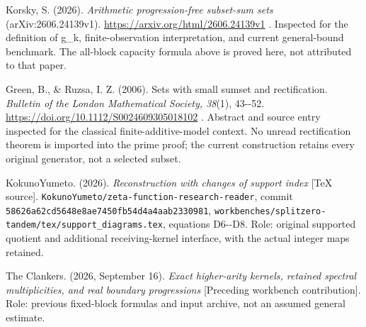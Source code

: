 Korsky, S. (2026). \emph{Arithmetic progression-free subset-sum sets} (arXiv:2606.24139v1). \url{https://arxiv.org/html/2606.24139v1} . Inspected for the definition of g\_k, finite-observation interpretation, and current general-bound benchmark. The all-block capacity formula above is proved here, not attributed to that paper.

Green, B., \& Ruzsa, I. Z. (2006). Sets with small sumset and rectification. \emph{Bulletin of the London Mathematical Society, 38}(1), 43-\/-52. \url{https://doi.org/10.1112/S0024609305018102} . Abstract and source entry inspected for the classical finite-additive-model context. No unread rectification theorem is imported into the prime proof; the current construction retains every original generator, not a selected subset.

KokunoYumeto. (2026). \emph{Reconstruction with changes of support index} {[}TeX source{]}. \nolinkurl{KokunoYumeto/zeta-function-research-reader}, commit \nolinkurl{58626a62cd5648e8ae7450fb54d4a4aab2330981}, \nolinkurl{workbenches/splitzero-tandem/tex/support_diagrams.tex}, equations D6-\/-D8. Role: original supported quotient and additional receiving-kernel interface, with the actual integer maps retained.

The Clankers. (2026, September 16). \emph{Exact higher-arity kernels, retained spectral multiplicities, and real boundary progressions} {[}Preceding workbench contribution{]}. Role: previous fixed-block formulas and input archive, not an assumed general estimate.
